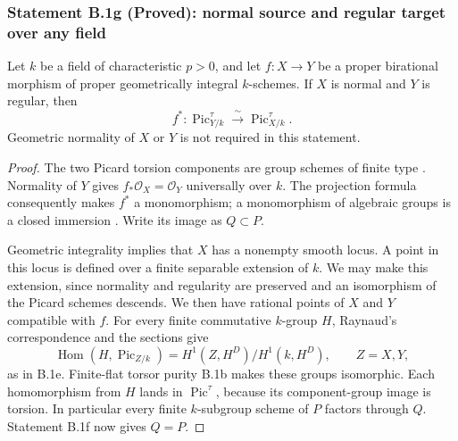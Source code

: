 \subsubsection*{Statement B.1g (Proved): normal source and regular target over any field}
Let $k$ be a field of characteristic $p>0$, and let $f:X\to Y$ be a
proper birational morphism of proper geometrically integral
$k$-schemes.  If $X$ is normal and $Y$ is regular, then
\[
 f^*:\operatorname{Pic}^{\tau}_{Y/k}
       \xrightarrow{\ \sim\ }\operatorname{Pic}^{\tau}_{X/k}.
\]
Geometric normality of $X$ or $Y$ is not required in this statement.
\begin{proof}
The two Picard torsion components are group schemes of finite type
\cite[Corollary 4.18.3, Proposition 6.12 and Remarks 6.14 and 6.19]{Kleiman2005}.
Normality of $Y$ gives $f_*\mathcal O_X=\mathcal O_Y$ universally over
$k$.  The projection formula consequently makes $f^*$ a monomorphism;
a monomorphism of algebraic groups is a closed immersion
\cite[Theorem 5.34]{MilneAG2022B}.  Write its image as $Q\subset P$.

Geometric integrality implies that $X$ has a nonempty smooth locus.
A point in this locus is defined over a finite separable extension
of $k$.  We may make this extension, since normality and regularity
are preserved and an isomorphism of the Picard schemes descends.
We then have rational points of $X$ and $Y$ compatible with $f$.
For every finite commutative $k$-group $H$, Raynaud's correspondence
and the sections give
\[
 \operatorname{Hom}(H,\operatorname{Pic}_{Z/k})
   =H^1(Z,H^D)/H^1(k,H^D),\qquad Z=X,Y,
\]
as in B.1e.  Finite-flat torsor purity B.1b makes these groups
isomorphic.  Each homomorphism from $H$ lands in $\operatorname{Pic}^
{\tau}$, because its component-group image is torsion.  In particular
every finite $k$-subgroup scheme of $P$ factors through $Q$.
Statement B.1f now gives $Q=P$.
\end{proof}
